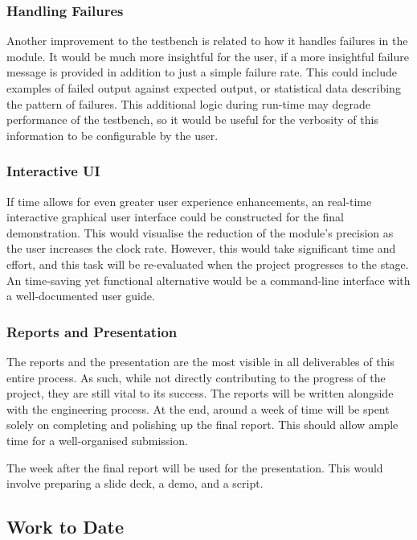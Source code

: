 \subsubsection{\textbf{Handling Failures}}
Another improvement to the testbench is related to how it handles failures
in the module.
It would be much more insightful for the user, if a more insightful failure
message is provided in addition to just a simple failure rate.
This could include examples of failed output against expected output,
or statistical data describing the pattern of failures.
This additional logic during run-time may degrade performance of the testbench,
so it would be useful for the verbosity of this information to be configurable
by the user.

\subsubsection{\textbf{Interactive UI}}
If time allows for even greater user experience enhancements, an real-time
interactive graphical user interface could be constructed for the final
demonstration.
This would visualise the reduction of the module's precision as the user
increases the clock rate.
However, this would take significant time and effort, and this task will
be re-evaluated when the project progresses to the stage.
An time-saving yet functional alternative would be a command-line interface
with a well-documented user guide.

\subsubsection{\textbf{Reports and Presentation}}
The reports and the presentation are the most visible in all deliverables of
this entire process.
As such, while not directly contributing to the progress of the project,
they are still vital to its success.
The reports will be written alongside with the engineering process.
At the end, around a week of time will be spent solely on completing and
polishing up the final report.
This should allow ample time for a well-organised submission.

The week after the final report will be used for the presentation.
This would involve preparing a slide deck, a demo, and a script.

\subsection{Work to Date}

